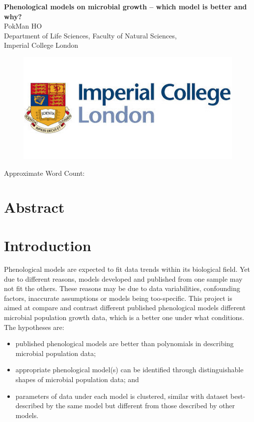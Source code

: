 \documentclass[a4paper, 11pt]{article}
\title{\ReportTitle}
\author{\ReportAuthor (CID: 01786076)}
\date{}
\newcommand{\ReportTitle}{Phenological models on microbial growth -- which model is better and why?} %
\newcommand{\ReportAuthor}{PokMan HO}
\newcommand{\ReportAffil}{Department of Life Sciences, Faculty of Natural Sciences,\\Imperial College London}
\begin{document}
	\begin{center}
		\Huge\textbf{\ReportTitle}\\
		\LARGE\ReportAuthor\\
		\Large\ReportAffil
	\end{center}
	\begin{figure}[h]
		\centering\includegraphics[width=\linewidth]{icl.jpg}
	\end{figure}
	\begin{flushright}
		\Large Approximate Word Count: %
	\end{flushright}
	\clearpage
	
	\maketitle
	\section*{Abstract}
	
	
	\section*{Introduction}
	Phenological models are expected to fit data trends within its biological field.  Yet due to different reasons, models developed and published from one sample may not fit the others.  These reasons may be due to data variabilities, confounding factors, inaccurate assumptions or models being too-specific.  This project is aimed at compare and contrast different published phenological models different microbial population growth data, which is a better one under what conditions.  The hypotheses are:
	\begin{itemize}
		\item published phenological models are better than polynomials in describing microbial population data;
		\item appropriate phenological model(s) can be identified through distinguishable shapes of microbial population data; and
		\item parameters of data under each model is clustered, similar with dataset best-described by the same model but different from those described by other models.
	\end{itemize}
	
\end{document}
